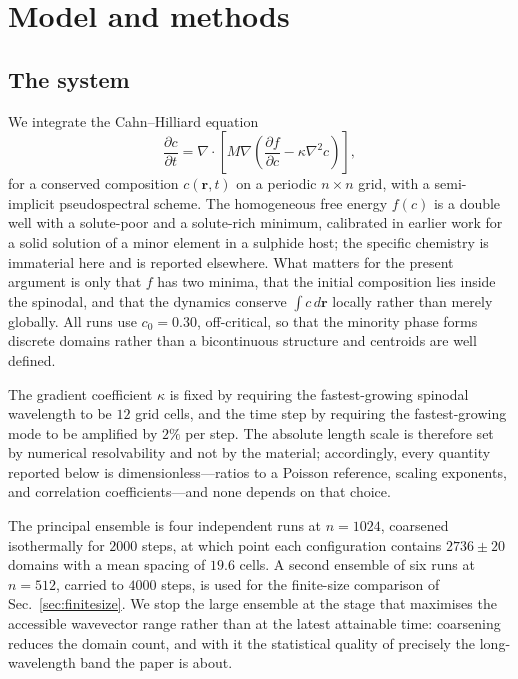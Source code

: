 \documentclass[aps,pre,twocolumn,superscriptaddress,floatfix,longbibliography]{revtex4-2}
\begin{document}
\section{Model and methods}

\subsection{The system}

We integrate the Cahn--Hilliard equation
\begin{equation}
  \frac{\partial c}{\partial t} = \nabla \cdot \left[ M \nabla
  \left( \frac{\partial f}{\partial c} - \kappa \nabla^2 c \right) \right],
\end{equation}
for a conserved composition $c(\mathbf{r}, t)$ on a periodic $n \times n$
grid, with a semi-implicit pseudospectral scheme. The homogeneous free energy
$f(c)$ is a double well with a solute-poor and a solute-rich minimum,
calibrated in earlier work for a solid solution of a minor element in a
sulphide host; the specific chemistry is immaterial here and is reported
elsewhere. What matters for the present argument is only that $f$ has two
minima, that the initial composition lies inside the spinodal, and that the
dynamics conserve $\int c \, d\mathbf{r}$ locally rather than merely globally.
All runs use $c_0 = 0.30$, off-critical, so that the minority phase forms
discrete domains rather than a bicontinuous structure and centroids are
well defined.

The gradient coefficient $\kappa$ is fixed by requiring the fastest-growing
spinodal wavelength to be $12$ grid cells, and the time step by requiring the
fastest-growing mode to be amplified by $2\%$ per step. The absolute length
scale is therefore set by numerical resolvability and not by the material;
accordingly, every quantity reported below is dimensionless---ratios to a
Poisson reference, scaling exponents, and correlation coefficients---and none
depends on that choice.

The principal ensemble is four independent runs at $n = 1024$, coarsened
isothermally for $2000$ steps, at which point each configuration contains
$2736 \pm 20$ domains with a mean spacing of $19.6$ cells. A second ensemble
of six runs at $n = 512$, carried to $4000$ steps, is used for the
finite-size comparison of Sec.~\ref{sec:finitesize}. We stop the large
ensemble at the stage that maximises the accessible wavevector range rather
than at the latest attainable time: coarsening reduces the domain count, and
with it the statistical quality of precisely the long-wavelength band the
paper is about.
\end{document}
